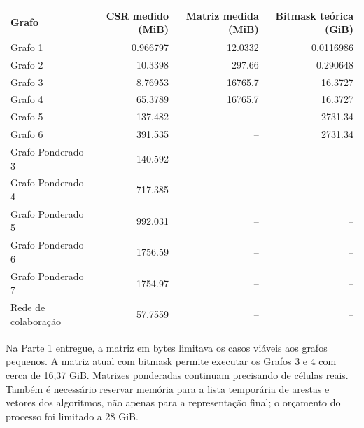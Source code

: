 \documentclass[a4paper,12pt]{article}
\begin{document}
\par\smallskip\noindent\begin{minipage}{\textwidth}\centering
\begingroup\fontsize{8.3}{10.8}\selectfont
\setlength{\tabcolsep}{4pt}
\begin{tabular}{lrrr}
\toprule
Grafo & CSR medido (MiB) & Matriz medida (MiB) & Bitmask teórica (GiB) \\
\midrule
Grafo 1 & \num{0.966797} & \num{12.0332} & \num{0.0116986} \\
Grafo 2 & \num{10.3398} & \num{297.66} & \num{0.290648} \\
Grafo 3 & \num{8.76953} & \num{16765.7} & \num{16.3727} \\
Grafo 4 & \num{65.3789} & \num{16765.7} & \num{16.3727} \\
Grafo 5 & \num{137.482} & -- & \num{2731.34} \\
Grafo 6 & \num{391.535} & -- & \num{2731.34} \\
Grafo Ponderado 3 & \num{140.592} & -- & -- \\
Grafo Ponderado 4 & \num{717.385} & -- & -- \\
Grafo Ponderado 5 & \num{992.031} & -- & -- \\
Grafo Ponderado 6 & \num{1756.59} & -- & -- \\
Grafo Ponderado 7 & \num{1754.97} & -- & -- \\
Rede de colaboração & \num{57.7559} & -- & -- \\
\bottomrule
\end{tabular}
\endgroup
{}
\end{minipage}\par\smallskip

Na Parte 1 entregue, a matriz em bytes limitava os casos viáveis aos grafos pequenos. A matriz atual com bitmask permite executar os Grafos 3 e 4 com cerca de 16,37 GiB. Matrizes ponderadas continuam precisando de células reais. Também é necessário reservar memória para a lista temporária de arestas e vetores dos algoritmos, não apenas para a representação final; o orçamento do processo foi limitado a 28 GiB.
\end{document}
